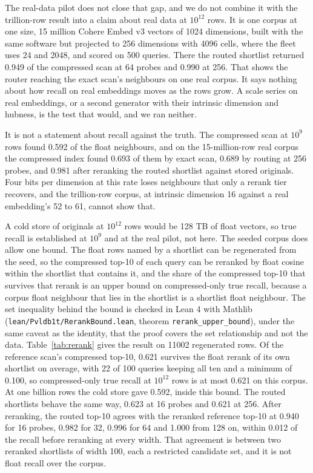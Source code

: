 \documentclass[sigconf, nonacm]{acmart}
\begin{document}
The real-data pilot does not close that gap, and we do not combine it with the trillion-row result
into a claim about real data at $10^{12}$ rows. It is one corpus at one size, 15 million Cohere
Embed v3 vectors of 1024 dimensions, built with the same software but projected to 256 dimensions
with 4096 cells, where the fleet uses 24 and 2048, and scored on 500 queries. There the routed
shortlist returned 0.949 of the compressed scan at 64 probes and 0.990 at 256. That shows the
router reaching the exact scan's neighbours on one real corpus. It says nothing about how recall on
real embeddings moves as the rows grow. A scale series on real embeddings, or a second generator
with their intrinsic dimension and hubness, is the test that would, and we ran neither.

It is not a statement about recall against the truth. The compressed scan at $10^{9}$ rows found
0.592 of the float neighbours, and on the 15-million-row real corpus the compressed index found
0.693 of them by exact scan, 0.689 by routing at 256 probes, and 0.981 after reranking the routed
shortlist against stored originals. Four bits per dimension at this rate loses neighbours that only
a rerank tier recovers, and the trillion-row corpus, at intrinsic dimension 16 against a real
embedding's 52 to 61, cannot show that.

A cold store of originals at $10^{12}$ rows would be 128 TB of float vectors, so true recall is
established at $10^{9}$ and at the real pilot, not here. The seeded corpus does allow one bound.
The float rows named by a shortlist can be regenerated from the seed, so the compressed top-10 of
each query can be reranked by float cosine within the shortlist that contains it, and the share of
the compressed top-10 that survives that rerank is an upper bound on compressed-only true recall,
because a corpus float neighbour that lies in the shortlist is a shortlist float neighbour. The set
inequality behind the bound is checked in Lean 4 with Mathlib
(\texttt{lean/Pvldb1t/RerankBound.lean}, theorem \texttt{rerank\_upper\_bound}), under the same
caveat as the identity, that the proof covers the set relationship and not the data.
Table~\ref{tab:rerank} gives the result on 11002 regenerated rows. Of the reference scan's
compressed top-10, 0.621 survives the float rerank of its own shortlist on average, with 22 of 100
queries keeping all ten and a minimum of 0.100, so compressed-only true recall at $10^{12}$ rows is
at most 0.621 on this corpus. At one billion rows the cold store gave 0.592, inside this bound. The
routed shortlists behave the same way, 0.623 at 16 probes and 0.621 at 256. After reranking, the
routed top-10 agrees with the reranked reference top-10 at 0.940 for 16 probes, 0.982 for 32, 0.996
for 64 and 1.000 from 128 on, within 0.012 of the recall before reranking at every width. That
agreement is between two reranked shortlists of width 100, each a restricted candidate set, and it
is not float recall over the corpus.
\end{document}
